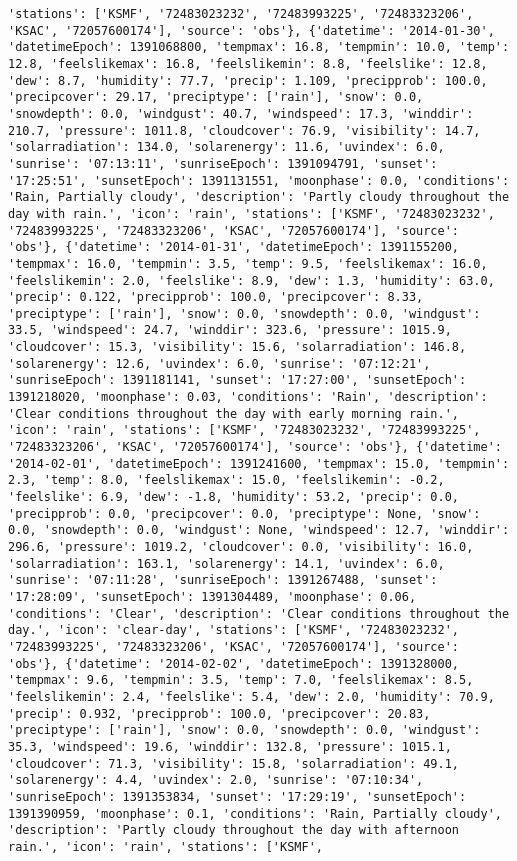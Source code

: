 \documentclass[
  letterpaper,
  DIV=11,
  numbers=noendperiod]{scrartcl}
\begin{document}
\begin{verbatim}
'stations': ['KSMF', '72483023232', '72483993225', '72483323206', 'KSAC', '72057600174'], 'source': 'obs'}, {'datetime': '2014-01-30', 'datetimeEpoch': 1391068800, 'tempmax': 16.8, 'tempmin': 10.0, 'temp': 12.8, 'feelslikemax': 16.8, 'feelslikemin': 8.8, 'feelslike': 12.8, 'dew': 8.7, 'humidity': 77.7, 'precip': 1.109, 'precipprob': 100.0, 'precipcover': 29.17, 'preciptype': ['rain'], 'snow': 0.0, 'snowdepth': 0.0, 'windgust': 40.7, 'windspeed': 17.3, 'winddir': 210.7, 'pressure': 1011.8, 'cloudcover': 76.9, 'visibility': 14.7, 'solarradiation': 134.0, 'solarenergy': 11.6, 'uvindex': 6.0, 'sunrise': '07:13:11', 'sunriseEpoch': 1391094791, 'sunset': '17:25:51', 'sunsetEpoch': 1391131551, 'moonphase': 0.0, 'conditions': 'Rain, Partially cloudy', 'description': 'Partly cloudy throughout the day with rain.', 'icon': 'rain', 'stations': ['KSMF', '72483023232', '72483993225', '72483323206', 'KSAC', '72057600174'], 'source': 'obs'}, {'datetime': '2014-01-31', 'datetimeEpoch': 1391155200, 'tempmax': 16.0, 'tempmin': 3.5, 'temp': 9.5, 'feelslikemax': 16.0, 'feelslikemin': 2.0, 'feelslike': 8.9, 'dew': 1.3, 'humidity': 63.0, 'precip': 0.122, 'precipprob': 100.0, 'precipcover': 8.33, 'preciptype': ['rain'], 'snow': 0.0, 'snowdepth': 0.0, 'windgust': 33.5, 'windspeed': 24.7, 'winddir': 323.6, 'pressure': 1015.9, 'cloudcover': 15.3, 'visibility': 15.6, 'solarradiation': 146.8, 'solarenergy': 12.6, 'uvindex': 6.0, 'sunrise': '07:12:21', 'sunriseEpoch': 1391181141, 'sunset': '17:27:00', 'sunsetEpoch': 1391218020, 'moonphase': 0.03, 'conditions': 'Rain', 'description': 'Clear conditions throughout the day with early morning rain.', 'icon': 'rain', 'stations': ['KSMF', '72483023232', '72483993225', '72483323206', 'KSAC', '72057600174'], 'source': 'obs'}, {'datetime': '2014-02-01', 'datetimeEpoch': 1391241600, 'tempmax': 15.0, 'tempmin': 2.3, 'temp': 8.0, 'feelslikemax': 15.0, 'feelslikemin': -0.2, 'feelslike': 6.9, 'dew': -1.8, 'humidity': 53.2, 'precip': 0.0, 'precipprob': 0.0, 'precipcover': 0.0, 'preciptype': None, 'snow': 0.0, 'snowdepth': 0.0, 'windgust': None, 'windspeed': 12.7, 'winddir': 296.6, 'pressure': 1019.2, 'cloudcover': 0.0, 'visibility': 16.0, 'solarradiation': 163.1, 'solarenergy': 14.1, 'uvindex': 6.0, 'sunrise': '07:11:28', 'sunriseEpoch': 1391267488, 'sunset': '17:28:09', 'sunsetEpoch': 1391304489, 'moonphase': 0.06, 'conditions': 'Clear', 'description': 'Clear conditions throughout the day.', 'icon': 'clear-day', 'stations': ['KSMF', '72483023232', '72483993225', '72483323206', 'KSAC', '72057600174'], 'source': 'obs'}, {'datetime': '2014-02-02', 'datetimeEpoch': 1391328000, 'tempmax': 9.6, 'tempmin': 3.5, 'temp': 7.0, 'feelslikemax': 8.5, 'feelslikemin': 2.4, 'feelslike': 5.4, 'dew': 2.0, 'humidity': 70.9, 'precip': 0.932, 'precipprob': 100.0, 'precipcover': 20.83, 'preciptype': ['rain'], 'snow': 0.0, 'snowdepth': 0.0, 'windgust': 35.3, 'windspeed': 19.6, 'winddir': 132.8, 'pressure': 1015.1, 'cloudcover': 71.3, 'visibility': 15.8, 'solarradiation': 49.1, 'solarenergy': 4.4, 'uvindex': 2.0, 'sunrise': '07:10:34', 'sunriseEpoch': 1391353834, 'sunset': '17:29:19', 'sunsetEpoch': 1391390959, 'moonphase': 0.1, 'conditions': 'Rain, Partially cloudy', 'description': 'Partly cloudy throughout the day with afternoon rain.', 'icon': 'rain', 'stations': ['KSMF', 
\end{verbatim}
\end{document}
